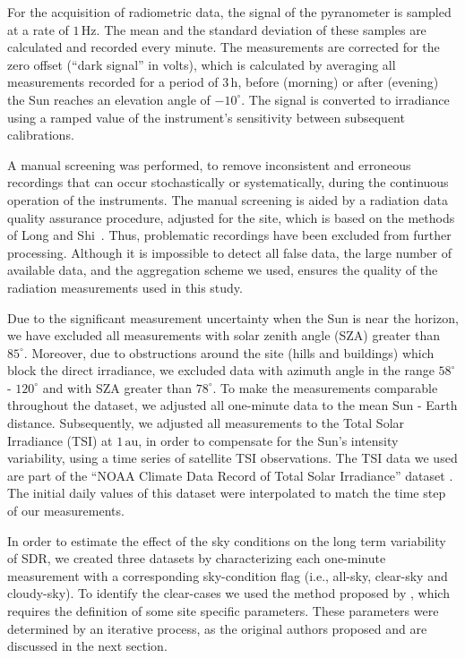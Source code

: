 \documentclass[applsci,article,submit,moreauthors,pdftex]{Definitions/mdpi}
\begin{document}
For the acquisition of radiometric data, the signal of the pyranometer
is sampled at a rate of \(1\,\text{Hz}\). The mean and the standard
deviation of these samples are calculated and recorded every minute. The
measurements are corrected for the zero offset (``dark signal'' in
volts), which is calculated by averaging all measurements recorded for a
period of \(3\,\text{h}\), before (morning) or after (evening) the Sun
reaches an elevation angle of \(-10^\circ\). The signal is converted to
irradiance using a ramped value of the instrument's sensitivity between
subsequent calibrations.

A manual screening was performed, to remove inconsistent and erroneous
recordings that can occur stochastically or systematically, during the
continuous operation of the instruments. The manual screening is aided
by a radiation data quality assurance procedure, adjusted for the site,
which is based on the methods of Long and
Shi~\citep{Long2006, Long2008a}. Thus, problematic recordings have been
excluded from further processing. Although it is impossible to detect
all false data, the large number of available data, and the aggregation
scheme we used, ensures the quality of the radiation measurements used
in this study.

Due to the significant measurement uncertainty when the Sun is near the
horizon, we have excluded all measurements with solar zenith angle (SZA)
greater than \(85^\circ\). Moreover, due to obstructions around the site
(hills and buildings) which block the direct irradiance, we excluded
data with azimuth angle in the range \(58^{\circ}\) - \(120^{\circ}\)
and with SZA greater than \(78^{\circ}\). To make the measurements
comparable throughout the dataset, we adjusted all one-minute data to
the mean Sun - Earth distance. Subsequently, we adjusted all
measurements to the Total Solar Irradiance (TSI) at \(1\,\text{au}\), in
order to compensate for the Sun's intensity variability, using a time
series of satellite TSI observations. The TSI data we used are part of
the ``NOAA Climate Data Record of Total Solar Irradiance'' dataset
\citep{Coddington2005}. The initial daily values of this dataset were
interpolated to match the time step of our measurements.

In order to estimate the effect of the sky conditions on the long term
variability of SDR, we created three datasets by characterizing each
one-minute measurement with a corresponding sky-condition flag (i.e.,
all-sky, clear-sky and cloudy-sky). To identify the clear-cases we used
the method proposed by \citet{Reno2016}, which requires the definition
of some site specific parameters. These parameters were determined by an
iterative process, as the original authors proposed and are discussed in
the next section.
\end{document}

